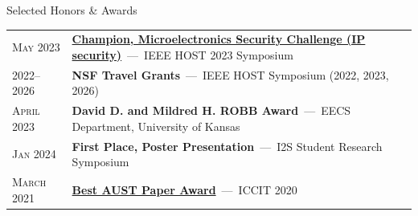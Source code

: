 \begin{rSection}{Selected Honors \& Awards}

\begin{tabular}{lp{15.9cm}}
    \textsc{May 2023} & \href{http://www.hostsymposium.org/host_2023awards.php}{\textbf{Champion, Microelectronics Security Challenge (IP security)}} \,---\, IEEE HOST 2023 Symposium \\
    \textsc{2022--2026} & \textbf{NSF Travel Grants} \,---\, IEEE HOST Symposium (2022, 2023, 2026) \\
    \textsc{April 2023} & \textbf{David D. and Mildred H. ROBB Award} \,---\, EECS Department, University of Kansas \\
    \textsc{Jan 2024} & \textbf{First Place, Poster Presentation} \,---\, I2S Student Research Symposium \\
    \textsc{March 2021} & \href{https://drive.google.com/file/d/1sGAuptK7AuKMWXy5Q9YS8xpSrfTNM8Ra/view?usp=sharing}{\textbf{Best AUST Paper Award}} \,---\, ICCIT 2020 \\
\end{tabular}

\end{rSection}
